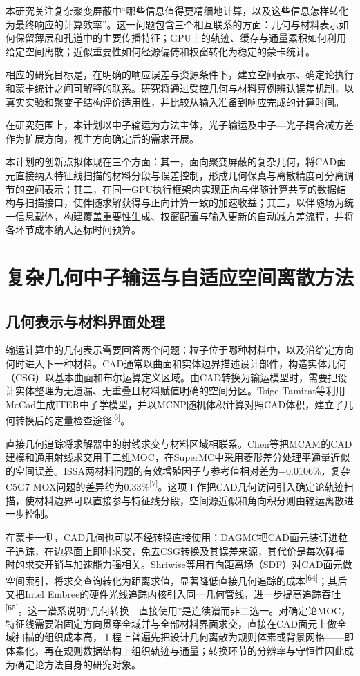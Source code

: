 \documentclass[UTF8, zihao=-4, fontset=none, a4paper]{ctexart}
\newcommand{\upcite}[1]{\textsuperscript{[#1]}}
\begin{document}
本研究关注复杂聚变屏蔽中“哪些信息值得更精细地计算，以及这些信息怎样转化为最终响应的计算效率”。这一问题包含三个相互联系的方面：几何与材料表示如何保留薄层和孔道中的主要传播特征；GPU上的轨迹、缓存与通量累积如何利用给定空间离散；近似重要性如何经源偏倚和权窗转化为稳定的蒙卡统计。

相应的研究目标是，在明确的响应误差与资源条件下，建立空间表示、确定论执行和蒙卡统计之间可解释的联系。研究将通过受控几何与材料算例辨认误差机制，以真实实验和聚变子结构评价适用性，并比较从输入准备到响应完成的计算时间。

在研究范围上，本计划以中子输运为方法主体，光子输运及中子---光子耦合减方差作为扩展方向，视主方向确定后的需求开展。

本计划的创新点拟体现在三个方面：其一，面向聚变屏蔽的复杂几何，将CAD面元直接纳入特征线扫描的材料分段与误差控制，形成几何保真与离散精度可分离调节的空间表示；其二，在同一GPU执行框架内实现正向与伴随计算共享的数据结构与扫描接口，使伴随求解获得与正向计算一致的加速收益；其三，以伴随场为统一信息载体，构建覆盖重要性生成、权窗配置与输入更新的自动减方差流程，并将各环节成本纳入达标时间预算。

\section{复杂几何中子输运与自适应空间离散方法}\label{sec:2}

\subsection{几何表示与材料界面处理}

输运计算中的几何表示需要回答两个问题：粒子位于哪种材料中，以及沿给定方向何时进入下一种材料。CAD通常以曲面和实体边界描述设计部件，构造实体几何（CSG）以基本曲面和布尔运算定义区域。由CAD转换为输运模型时，需要把设计实体整理为无遗漏、无重叠且材料赋值明确的空间分区。Tsige-Tamirat等利用McCad生成ITER中子学模型，并以MCNP随机体积计算对照CAD体积，建立了几何转换后的定量检查途径\upcite{6}。

直接几何追踪将求解器中的射线求交与材料区域相联系。Chen等把MCAM的CAD建模和通用射线求交用于二维MOC，在SuperMC中采用菱形差分处理平通量近似的空间误差。ISSA两材料问题的有效增殖因子与参考值相对差为−0.0106\%，复杂C5G7-MOX问题的差异约为0.33\%\upcite{7}。这项工作把CAD几何访问引入确定论轨迹扫描，使材料边界可以直接参与特征线分段，空间源近似和角向积分则由输运离散进一步控制。

在蒙卡一侧，CAD几何也可以不经转换直接使用：DAGMC把CAD面元装订进粒子追踪，在边界面上即时求交，免去CSG转换及其误差来源，其代价是每次碰撞时的求交开销与加速能力强相关。Shriwise等用有向距离场（SDF）对CAD面元做空间索引，将求交查询转化为距离求值，显著降低直接几何追踪的成本\upcite{64}；其后又把Intel Embree的硬件光线追踪内核引入同一几何管线，进一步提高追踪吞吐\upcite{65}。这一谱系说明“几何转换---直接使用”是连续谱而非二选一。对确定论MOC，特征线需要沿固定方向贯穿全域并与全部材料界面求交，直接在CAD面元上做全域扫描的组织成本高，工程上普遍先把设计几何离散为规则体素或背景网格---\/---即体素化，再在规则数据结构上组织轨迹与通量；转换环节的分辨率与守恒性因此成为确定论方法自身的研究对象。
\end{document}
